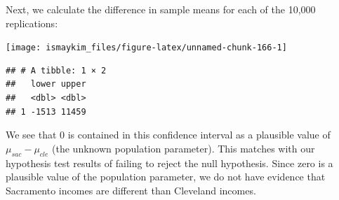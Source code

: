\documentclass[]{tufte-book}
\newenvironment{Shaded}{\begin{snugshade}}{\end{snugshade}}
\newcommand{\KeywordTok}[1]{\textcolor[rgb]{0.13,0.29,0.53}{\textbf{{#1}}}}
\newcommand{\DataTypeTok}[1]{\textcolor[rgb]{0.13,0.29,0.53}{{#1}}}
\newcommand{\DecValTok}[1]{\textcolor[rgb]{0.00,0.00,0.81}{{#1}}}
\newcommand{\FloatTok}[1]{\textcolor[rgb]{0.00,0.00,0.81}{{#1}}}
\newcommand{\StringTok}[1]{\textcolor[rgb]{0.31,0.60,0.02}{{#1}}}
\newcommand{\NormalTok}[1]{{#1}}
\begin{document}
Next, we calculate the difference in sample means for each of the 10,000
replications:

\begin{Shaded}
\end{Shaded}

\begin{Shaded}
\end{Shaded}

\begin{center}\texttt{[image: ismaykim\_files/figure-latex/unnamed-chunk-166-1]} \end{center}

\begin{Shaded}
\end{Shaded}

\begin{verbatim}
## # A tibble: 1 × 2
##   lower upper
##   <dbl> <dbl>
## 1 -1513 11459
\end{verbatim}

We see that 0 is contained in this confidence interval as a plausible
value of \(\mu_{sac} - \mu_{cle}\) (the unknown population parameter).
This matches with our hypothesis test results of failing to reject the
null hypothesis. Since zero is a plausible value of the population
parameter, we do not have evidence that Sacramento incomes are different
than Cleveland incomes.
\end{document}
